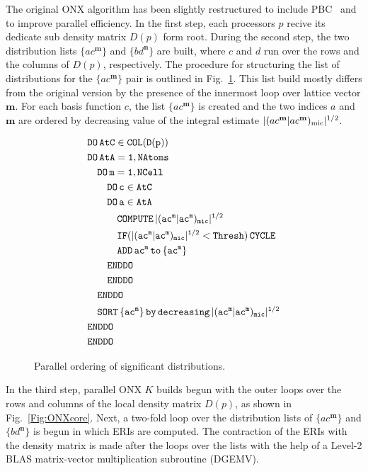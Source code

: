 \documentclass[prl,twocolumn,showpacs,twocolumngrid,superbib]{revtex4}
\begin{document}
The original ONX algorithm has been slightly restructured 
to include PBC~\cite{CTymczak04b} and to improve parallel efficiency.
In the first step, each processors $p$ recive its dedicate sub density matrix $D(p)$ form root.
During the second step, the two distribution lists $\{ac^\mathbf{m}\}$ and
$\{bd^\mathbf{n}\}$ are built, where $c$ and $d$ run over the rows and the
columns of $D(p)$, respectively. The procedure for structuring the list of distributions
for the $\{ac^\mathbf{m}\}$ pair is outlined in Fig.~\ref{Fig:List}.
This list build mostly differs from the original version by the presence
of the innermost loop over lattice vector $\mathbf{m}$. For
each basis function $c$, the list $\{ac^\mathbf{m}\}$ is created and the 
two indices $a$ and $\mathbf{m}$ are ordered by decreasing value 
of the integral estimate $|(ac^\mathbf{m}|ac^\mathbf{m})_{\rm mic}|^{1/2}$.

\begin{figure}[htbp]
  \centering
  \caption{\protect
    Parallel ordering of significant distributions.
  }\label{Fig:List}
  \begin{equation*}
    \begin{split}
      &\tt          DO\,AtC\in COL(D(p))\\
      &\tt          DO\,AtA=1,NAtoms\\
      &\tt\quad       DO\,m=1,NCell\\
      &\tt\qquad        DO\,c\in AtC\\
      &\tt\qquad        DO\,a\in AtA\\
      &\tt\qquad\quad     COMPUTE\,|(ac^m|ac^m)_{mic}|^{1/2}\\
      &\tt\qquad\quad     IF(|(ac^m|ac^m)_{mic}|^{1/2}<{\tt Thresh)\,CYCLE}\\
      &\tt\qquad\quad     ADD\,ac^m\,{\tt to}\, \{ac^m\}\\
      &\tt\qquad        ENDDO\\
      &\tt\qquad        ENDDO\\
      &\tt\quad       ENDDO\\
      &\tt\quad       SORT\,\{ac^m\}\,by\,decreasing\,|(ac^m|ac^m)_{mic}|^{1/2}\\
      &\tt         ENDDO\\
      &\tt         ENDDO
    \end{split}
  \end{equation*}
\end{figure}

In the third step, parallel ONX $K$ builds begun with the outer loops over
the rows and columns of the local density matrix $D(p)$, 
as shown in Fig.~\ref{Fig:ONXcore}. Next, a two-fold loop over
the distribution lists of $\{ac^\mathbf{m}\}$ and $\{bd^\mathbf{n}\}$
is begun in which ERIs are computed. The contraction of 
the ERIs with the density matrix is made after the loops over the lists with the help of a 
Level-2 BLAS matrix-vector multiplication subroutine (DGEMV).
\end{document}
